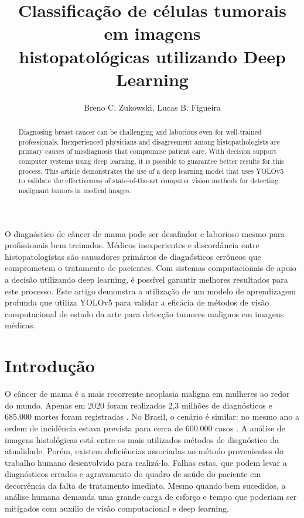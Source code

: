 \documentclass[12pt]{article}
\title{Classificação de células tumorais em imagens\\ histopatológicas utilizando Deep Learning}
\author{Breno C. Zukowski\inst{1}, Lucas B. Figueira\inst{1}}
\begin{document}
\maketitle

\begin{abstract}
  Diagnosing breast cancer can be challenging and laborious even for well-trained professionals.
  Inexperienced physicians and disagreement among histopathologists are primary causes of misdiagnosis
  that compromise patient care. With decision support computer systems using deep learning, it is possible to guarantee better results for this process. This article demonstrates the use
  of a deep learning model that uses YOLOv5 to validate the effectiveness of state-of-the-art computer vision methods for detecting malignant tumors in medical images.
\end{abstract}

\begin{resumo}
  O diagnóstico de câncer de mama pode ser desafiador e laborioso mesmo para profissionais bem treinados.
  Médicos inexperientes e discordância entre histopatologistas são causadores primários de diagnósticos errôneos
  que comprometem o tratamento de pacientes. Com sistemas computacionais de apoio a decisão utilizando deep learning, é possível garantir melhores resultados para este processo. Este artigo demonstra a utilização
  de um modelo de aprendizagem profunda que utiliza YOLOv5 para validar a eficácia de métodos de visão computacional de estado da arte para detecção tumores malignos em imagens médicas.
\end{resumo}


\section{Introdução}

O câncer de mama é a mais recorrente neoplasia maligna em mulheres ao redor do mundo. Apenas em 2020 foram realizados 2,3 milhões de diagnósticos e 685.000 mortes foram registradas \cite{who2021}. No Brasil, o cenário é similar: no mesmo ano a ordem de incidência estava prevista para cerca de 600.000 casos \cite{inca2018}. A análise de imagens histológicas está entre os mais utilizados métodos de diagnóstico da atualidade. Porém, existem deficiências associadas ao método provenientes do trabalho humano desenvolvido para realizá-lo. Falhas estas, que podem levar a diagnósticos errados e agravamento do quadro de saúde do paciente em decorrência da falta de tratamento imediato. Mesmo quando bem sucedidos, a análise humana demanda uma grande carga de esforço e tempo que poderiam ser mitigados com auxílio de visão computacional e deep learning.
\end{document}
